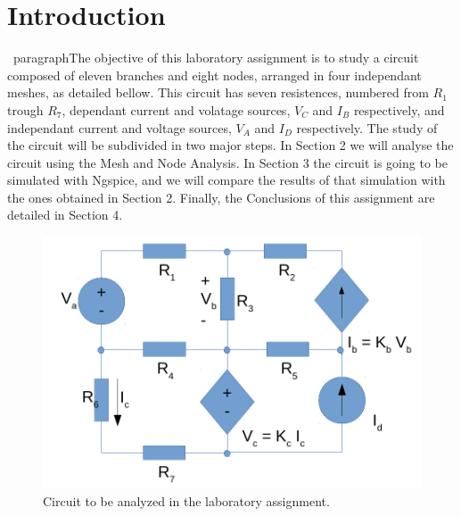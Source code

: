 \section{Introduction}
\label{sec:introduction}

\ paragraph{}The objective of this laboratory assignment is to study a circuit composed of eleven branches and eight nodes, arranged in four independant meshes,
 as detailed bellow. This circuit has seven resistences, numbered from $R_1$ trough $R_7$, dependant current and volatage sources, $V_C$ and $I_B$ respectively,
 and independant current and voltage sources, $V_A$ and $I_D$ respectively.
The study of the circuit will be subdivided in two major steps. In Section 2 we will analyse the circuit using the Mesh and Node Analysis. In Section 3 the circuit is going to be simulated
 with Ngspice, and we will compare the results of that simulation with the ones obtained in Section 2.
Finally, the Conclusions of this assignment are detailed in Section 4.

\begin{figure}[h] \centering
\includegraphics[width=0.4\linewidth]{circuit.pdf}
\caption{Circuit to be analyzed in the laboratory assignment.}
\label{fig:rc}
\end{figure}



